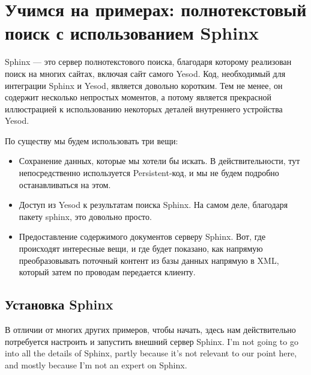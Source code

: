 \chapter{Учимся на примерах: полнотекстовый поиск с использованием Sphinx} %


Sphinx --- это сервер полнотекстового поиска, благодаря которому реализован поиск на многих сайтах, включая сайт самого Yesod. Код, необходимый для интеграции Sphinx и Yesod, является довольно коротким. Тем не менее, он содержит несколько непростых моментов, а потому является прекрасной иллюстрацией к использованию некоторых деталей внутреннего устройства Yesod. %

По существу мы будем использовать три вещи: %

\begin{itemize}
  \item Сохранение данных, которые мы хотели бы искать. В действительности, тут непосредственно используется Persistent-код, и мы не будем подробно останавливаться на этом. %
  \item Доступ из Yesod к результатам поиска Sphinx. На самом деле, благодаря пакету sphinx, это довольно просто.
  \item Предоставление содержимого документов серверу Sphinx. Вот, где происходят интересные вещи, и где будет показано, как напрямую преобразовывать поточный контент из базы данных напрямую в XML, который затем по проводам передается клиенту. %
\end{itemize}

\section{Установка Sphinx} %

В отличии от многих других примеров, чтобы начать, здесь нам действительно потребуется настроить и запустить внешний сервер Sphinx. I'm not going to go into all the details of Sphinx, partly because it's not relevant to our point here, and mostly because I'm not an expert on Sphinx.

